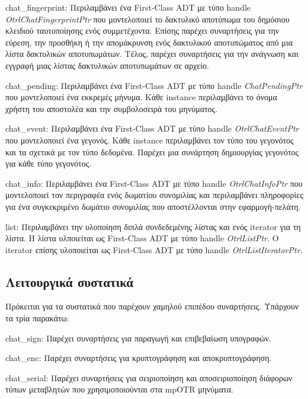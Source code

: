 \begin{description}
  \item chat\_fingerprint: Περιλαμβάνει ένα First-Class ADT με τύπο handle \emph{OtrlChatFingerprintPtr} που μοντελοποιεί το δακτυλικό αποτύπωμα του δημόσιου κλειδιού ταυτοποίησης ενός συμμετέχοντα. Επίσης παρέχει συναρτήσεις για την εύρεση, την προσθήκη ή την απομάκρυνση ενός δακτυλικού αποτυπώματος από μια λίστα δακτυλικών αποτυπωμάτων. Τέλος, παρέχει συναρτήσεις για την ανάγνωση και εγγραφή μιας λίστας δακτυλικών αποτυπωμάτων σε αρχείο.
  
  \item chat\_pending: Περιλαμβάνει ένα First-Class ADT με τύπο handle \emph{ChatPendingPtr} που μοντελοποιεί ένα εκκρεμές μήνυμα. Κάθε instance περιλαμβάνει το όνομα χρήστη του αποστολέα και την συμβολοσειρά του μηνύματος.
  
  \item chat\_event: Περιλαμβάνει ένα First-Class ADT με τύπο handle \emph{OtrlChatEventPtr} που μοντελοποιεί ένα γεγονός. Κάθε instance περιλαμβάνει τον τύπο του γεγονότος και τα σχετικά με τον τύπο δεδομένα. Παρέχει μια συνάρτηση δημιουργίας γεγονότος για κάθε τύπο γεγονότος.

  \item chat\_info:  Περιλαμβάνει ένα First-Class ADT με τύπο handle \emph{OtrlChatInfoPtr} που μοντελοποιεί τον περιγραφέα ενός δωματίου συνομιλίας και περιλαμβάνει πληροφορίες για ένα συγκεκριμένο δωμάτιο συνομιλίας που αποστέλλονται στην εφαρμογή-πελάτη.
  
  \item{list}: Περιλαμβάνει την υλοποίηση διπλά συνδεδεμένης λίστας και ενός iterator για τη λίστα. Η λίστα υλποιείται ως First-Class ADT με τύπο handle \emph{OtrlListPtr}. Ο iterator επίσης υλοποιείται ως First-Class ADT με τύπο handle \emph{OtrlListIteratorPtr}.
\end{description}


\subsection{Λειτουργικά συστατικά}
Πρόκειται για τα συστατικά που παρέχουν χαμηλού επιπέδου συναρτήσεις. Υπάρχουν τα τρία παρακάτω:

\begin{description}
  \item chat\_sign: Παρέχει συναρτήσεις για παραγωγή και επιβεβαίωση υπογραφών.

  \item chat\_enc: Παρέχει συναρτήσεις για κρυπτογράφηση και αποκρυπτογράφηση.

  \item chat\_serial: Παρέχει συναρτήσεις για σειριοποίηση και αποσειριοποίηση διάφορων τύπων μεταβλητών που χρησιμοποιούνται στα mpOTR μηνύματα. 
\end{description}

